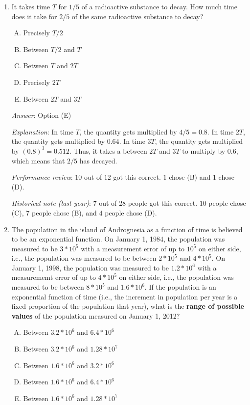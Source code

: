 \documentclass[10pt]{amsart}
\begin{document}
\begin{enumerate}
\item It takes time $T$ for $1/5$ of a radioactive substance to
  decay. How much time does it take for $2/5$ of the same radioactive
  substance to decay? 

  \begin{enumerate}[(A)]
  \item Precisely $T/2$
  \item Between $T/2$ and $T$
  \item Between $T$ and $2T$
  \item Precisely $2T$
  \item Between $2T$ and $3T$
  \end{enumerate}

  {\em Answer}: Option (E)

  {\em Explanation}: In time $T$, the quantity gets multiplied by $4/5
  = 0.8$. In time $2T$, the quantity gets multiplied by $0.64$. In
  time $3T$, the quantity gets multiplied by $(0.8)^3 = 0.512$. Thus, it
  takes a between $2T$ and $3T$ to multiply by $0.6$, which means that
  $2/5$ has decayed.

  {\em Performance review}: $10$ out of $12$ got this correct. $1$
  chose (B) and $1$ chose (D).

  {\em Historical note (last year)}: $7$ out of $28$ people got this
  correct. $10$ people chose (C), $7$ people chose (B), and $4$ people
  chose (D).

\item The population in the island of Andrognesia as a function of
  time is believed to be an exponential function. On January 1, 1984,
  the population was measured to be $3 * 10^5$ with a measurement
  error of up to $10^5$ on either side, i.e., the population was
  measured to be between $2* 10^5$ and $4 * 10^5$. On January 1,
  1998, the population was measured to be $1.2 * 10^6$ with a
  measurememt error of up to $4 * 10^5$ on either side, i.e., the
  population was measured to be between $8 * 10^5$ and $1.6 *
  10^6$. If the population is an exponential function of time (i.e.,
  the increment in population per year is a fixed proportion of the
  population that year), what is the {\bf range of possible values} of
  the population measured on January 1, 2012?

  \begin{enumerate}[(A)]
  \item Between $3.2 * 10^6$ and $6.4 * 10^6$
  \item Between $3.2 * 10^6$ and $1.28 * 10^7$
  \item Between $1.6 * 10^6$ and $3.2 * 10^6$
  \item Between $1.6 * 10^6$ and $6.4 * 10^6$
  \item Between $1.6 * 10^6$ and $1.28 * 10^7$
  \end{enumerate}


\end{enumerate}
\end{document}
